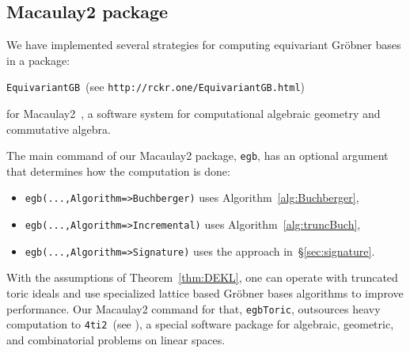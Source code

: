\subsection{Macaulay2 package}

We have implemented several strategies for computing equivariant Gr\"obner bases in a package: \begin{center}
\verb|EquivariantGB|~(see {\tt http://rckr.one/EquivariantGB.html}) 
\end{center}
for Macaulay2~\cite{grayson2002macaulay}, a software system for computational algebraic geometry and commutative algebra.

The main command of our Macaulay2 package, \verb|egb|, has an optional argument that determines how the computation is done:
\begin{itemize}
\item 
\verb|egb(...,Algorithm=>Buchberger)| uses Algorithm~\ref{alg:Buchberger},
\item 
\verb|egb(...,Algorithm=>Incremental)| uses Algorithm~\ref{alg:truncBuch},
\item 
\verb|egb(...,Algorithm=>Signature)| uses the approach in~\S\ref{sec:signature}.
\end{itemize}

\begin{remark}\label{rem:4ti2}
With the assumptions of Theorem~\ref{thm:DEKL}, one can operate  with truncated toric ideals and use specialized lattice based Gr\"obner bases algorithms to improve performance. 
Our Macaulay2 command for that, \verb|egbToric|, outsources heavy computation to \verb|4ti2|~(see \cite{4ti2}),  a special software package for algebraic, geometric, and combinatorial problems on linear spaces.   
\end{remark}
